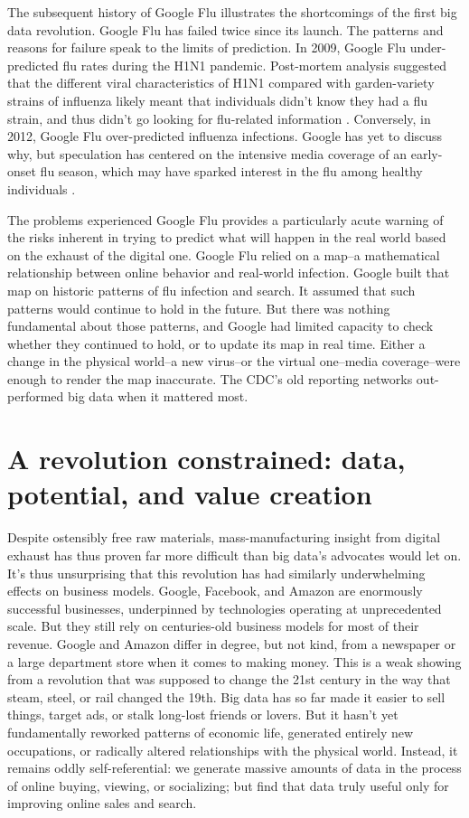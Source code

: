 \documentclass[12pt]{article}
\begin{document}
The subsequent history of Google Flu illustrates the shortcomings of
the first big data revolution. Google Flu has failed twice since its
launch. The patterns and reasons for failure speak to the limits of
prediction. In 2009, Google Flu under-predicted flu rates during the
H1N1 pandemic. Post-mortem analysis suggested that the different viral
characteristics of H1N1 compared with garden-variety strains of
influenza likely meant that individuals didn't know they had a flu
strain, and thus didn't go looking for flu-related information
\citep{cook2011assessing}. Conversely, in 2012, Google Flu
over-predicted influenza infections. Google has yet to discuss why,
but speculation has centered on the intensive media coverage of an
early-onset flu season, which may have sparked interest in the flu among
healthy individuals \citep{butler2013google}.

The problems experienced Google Flu provides a particularly acute
warning of the risks inherent in trying to predict what will happen in
the real world based on the exhaust of the digital one. Google Flu
relied on a map--a mathematical relationship between online behavior
and real-world infection. Google built that map on historic patterns
of flu infection and search. It assumed that such patterns would
continue to hold in the future. But there was nothing fundamental
about those patterns, and Google had limited capacity to check whether
they continued to hold, or to update its map in real time. Either a change in
the physical world--a new virus--or the virtual one--media
coverage--were enough to render the map inaccurate. The CDC's old
reporting networks out-performed big data when it mattered most.



\section{A revolution constrained: data, potential, and value creation}
\label{sec:but-what-can}

Despite ostensibly free raw materials, mass-manufacturing insight from
digital exhaust has thus proven far more difficult than big data's
advocates would let on. It's thus unsurprising that this revolution
has had similarly underwhelming effects on business models. Google,
Facebook, and Amazon are enormously successful businesses, underpinned
by technologies operating at unprecedented scale. But they still rely
on centuries-old business models for most of their revenue. Google and
Amazon differ in degree, but not kind, from a newspaper or a large
department store when it comes to making money. This is a weak showing
from a revolution that was supposed to change the 21st century in the
way that steam, steel, or rail changed the 19th. Big data has so far
made it easier to sell things, target ads, or stalk long-lost friends
or lovers. But it hasn't yet fundamentally reworked patterns of
economic life, generated entirely new occupations, or radically
altered relationships with the physical world. Instead, it remains
oddly self-referential: we generate massive amounts of data in the
process of online buying, viewing, or socializing; but find that data
truly useful only for improving online sales and search.
\end{document}
